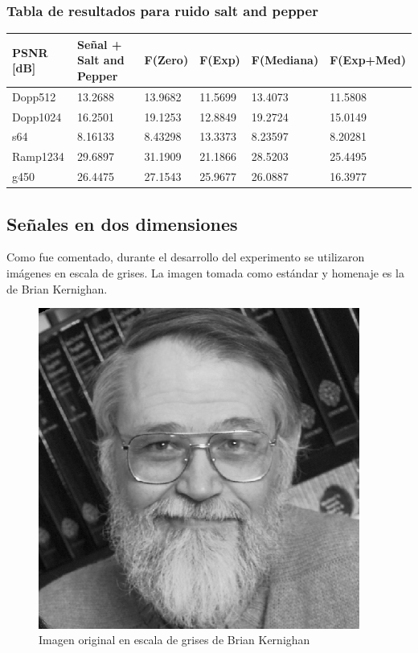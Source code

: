 \subsubsection{Tabla de resultados para ruido salt and pepper}

\begin{table}[H]
        \begin{tabular}{|l|lllll|}
                \hline
                \textbf{PSNR [dB]} & Se\~nal + Salt and Pepper  & F(Zero) & F(Exp) & F(Mediana) & F(Exp+Med) \\ \hline
                    Dopp512 		& 13.2688 					& 13.9682 & 11.5699 & 13.4073   & 11.5808 \\
                    Dopp1024 		& 16.2501 					& 19.1253 & 12.8849 & 19.2724  & 15.0149 \\
                    s64				 & 8.16133 					& 8.43298 & 13.3373 & 8.23597  &  8.20281\\
                    Ramp1234 		& 29.6897 					& 31.1909 & 21.1866 & 28.5203  & 25.4495\\
                    g450 			& 26.4475 					& 27.1543 & 25.9677 & 26.0887  &  16.3977\\ \hline
                    \end{tabular}
                \end{table}


\newpage

        \subsection{Se\~nales en dos dimensiones}

Como fue comentado, durante el desarrollo del experimento se utilizaron
im\'agenes en escala de grises. La imagen tomada como est\'andar y homenaje es 
la de Brian Kernighan.

\begin{figure}[H]
\begin {center}
\includegraphics[width=299pt]{imagenes/brian_kernighan.png}
\end {center}
\caption{Imagen original en escala de grises de Brian Kernighan}
\label{fig:SinProm}
\end{figure}

